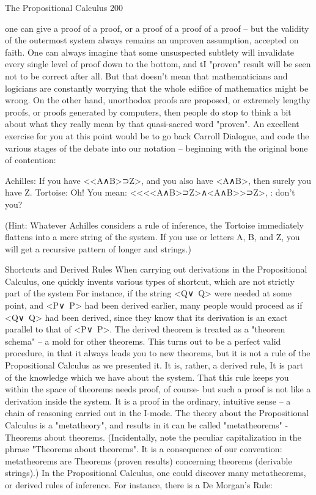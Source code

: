 The Propositional Calculus                                                           200

one can give a proof of a proof, or a proof of a proof of a proof – but the validity of the
outermost system always remains an unproven assumption, accepted on faith. One can
always imagine that some unsuspected subtlety will invalidate every single level of proof
down to the bottom, and tI "proven" result will be seen not to be correct after all. But that
doesn’t mean that mathematicians and logicians are constantly worrying that the whole
edifice of mathematics might be wrong. On the other hand, unorthodox proofs are
proposed, or extremely lengthy proofs, or proofs generated by computers, then people do
stop to think a bit about what they really mean by that quasi-sacred word "proven".
        An excellent exercise for you at this point would be to go back Carroll Dialogue,
and code the various stages of the debate into our notation -- beginning with the original
bone of contention:

Achilles: If you have <<A∧B>⊃Z>, and you also have <A∧B>, then surely you have Z.
Tortoise: Oh! You mean: <<<<A∧B>⊃Z>∧<A∧B>>⊃Z>, : don't you?

(Hint: Whatever Achilles considers a rule of inference, the Tortoise immediately flattens
into a mere string of the system. If you use or letters A, B, and Z, you will get a recursive
pattern of longer and strings.)

                            Shortcuts and Derived Rules
When carrying out derivations in the Propositional Calculus, one quickly invents various
types of shortcut, which are not strictly part of the system For instance, if the string
<Q∨~Q> were needed at some point, and <P∨~P> had been derived earlier, many people
would proceed as if <Q∨~Q> had been derived, since they know that its derivation is an
exact parallel to that of <P∨~P>. The derived theorem is treated as a "theorem schema" --
a mold for other theorems. This turns out to be a perfect valid procedure, in that it always
leads you to new theorems, but it is not a rule of the Propositional Calculus as we
presented it. It is, rather, a derived rule, It is part of the knowledge which we have about
the system. That this rule keeps you within the space of theorems needs proof, of course-
but such a proof is not like a derivation inside the system. It is a proof in the ordinary,
intuitive sense -- a chain of reasoning carried out in the I-mode. The theory about the
Propositional Calculus is a "metatheory", and results in it can be called "metatheorems" -
Theorems about theorems. (Incidentally, note the peculiar capitalization in the phrase
"Theorems about theorems". It is a consequence of our convention: metatheorems are
Theorems (proven results) concerning theorems (derivable strings).)
        In the Propositional Calculus, one could discover many metatheorems, or derived
rules of inference. For instance, there is a De Morgan's Rule:




